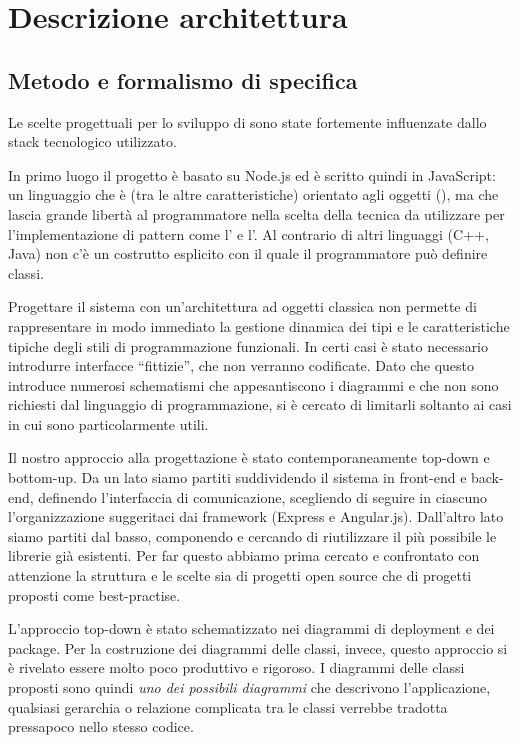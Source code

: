 \section{Descrizione architettura}

\subsection{Metodo e formalismo di specifica}

Le scelte progettuali per lo sviluppo di \ProjectName{} sono state fortemente influenzate dallo stack tecnologico utilizzato.

In primo luogo il progetto è basato su Node.js ed è scritto quindi in JavaScript: un linguaggio che è (tra le altre caratteristiche) orientato agli oggetti (), ma che lascia grande libertà al programmatore nella scelta della tecnica da utilizzare per l'implementazione di pattern come l' e l'. Al contrario di altri linguaggi (C++, Java) non c'è un costrutto esplicito con il quale il programmatore può definire classi. 

Progettare il sistema con un'architettura ad oggetti classica non permette di rappresentare in modo immediato la gestione dinamica dei tipi e le caratteristiche tipiche degli stili di programmazione funzionali. In certi casi è stato necessario introdurre interfacce ``fittizie'', che non verranno codificate. Dato che questo introduce numerosi schematismi che appesantiscono i diagrammi e che non sono richiesti dal linguaggio di programmazione, si è cercato di limitarli soltanto ai casi in cui sono particolarmente utili.

Il nostro approccio alla progettazione è stato contemporaneamente top-down e bottom-up. Da un lato siamo partiti suddividendo il sistema in front-end e back-end, definendo l'interfaccia di comunicazione, scegliendo di seguire in ciascuno l'organizzazione suggeritaci dai framework (Express e Angular.js). Dall'altro lato siamo partiti dal basso, componendo e cercando di riutilizzare il più possibile le librerie già esistenti. Per far questo abbiamo prima cercato e confrontato con attenzione la struttura e le scelte sia di progetti open source che di progetti proposti come best-practise.

L'approccio top-down è stato schematizzato nei diagrammi di deployment e dei package. Per la costruzione dei diagrammi delle classi, invece, questo approccio si è rivelato essere molto poco produttivo e rigoroso. I diagrammi delle classi proposti sono quindi \emph{uno dei possibili diagrammi} che descrivono l'applicazione, qualsiasi gerarchia o relazione complicata tra le classi verrebbe tradotta pressapoco nello stesso codice.

